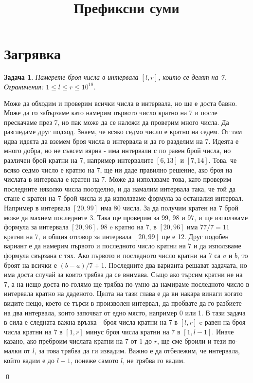 \documentclass[]{article}
\title{Префиксни суми}
\author{}
\newtheorem{problem}{Задача}
\newenvironment{solution}{\noindent{\bf Решение.}\hspace*{1em}}{\qed\par}
\begin{document}
\maketitle

\section{Загрявка}
\begin{problem}
Намерете броя числа в интервала $[l, r]$, които се делят на 7.\newline
Ограничения: $1\leq l\leq r\leq 10^{18}$.
\end{problem}
\begin{solution}
Може да обходим и проверим всички числа в интервала, но ще е доста бавно. Може да го забързаме като намерим първото число кратно на 7 и после прескачаме през 7, но пак може да се наложи да проверим много числа.\newline
Да разгледаме друг подход. Знаем, че всяко седмо число е кратно на седем. От там идва идеята да вземем броя числа в интервала и да го разделим на 7. Идеята е много добра, но не съвсем вярна - има интервали с по равен брой числа, но различен брой кратни на 7, например интервалите $[6,13]$ и $[7,14]$. Това, че всяко седмо число е кратно на 7, ще ни даде правилно решение, ако броя на числата в интервала е кратен на 7.
Може да използваме това, като проверим последните няколко числа поотделно, и да намалим интервала така, че той да стане с кратен на 7 брой числа и да използваме формула за останалия интервал. Например в интервала $[20,99]$ има 80 числа. За да получим кратен на 7 брой може да махнем последните 3. Така ще проверим за 99, 98 и 97, и ще използваме формула за интервала $[20,96]$. 98 e кратно на 7, в $[20,96]$ има $77/7=11$ кратни на 7, и общия отговор за интервала $[20,99]$ ще е 12.\newline
Друг подобен вариант е да намерим първото и последното число кратни на 7 и да използваме формула свързана с тях. Ако първото и последното число кратни на 7 са $a$ и $b$, то броят на всички е $(b-a)/7+1$.\newline
Последните два варианта решават задачата, но има доста случай за които трябва да се внимава. Също ако търсим кратни не на 7, а на нещо доста по-голямо ще трябва по-умно да намираме последното число в интервала кратно на даденото.\newline
Целта на тази глава е да ви накара винаги когато видите нещо, което се търси в произволен интервал, да пробвате да го разбиете на два интервала, които започват от едно място, например 0 или 1. В тази задача в сила е следната важна връзка - броя числа кратни на 7 в $[l,r]$ e равен на броя числа кратни на 7 в $[1,r]$ минус броя числа кратни на 7 в $[1,l-1]$. Иначе казано, ако преброим числата кратни на 7 от 1 до $r$, ще сме броили и тези по-малки от $l$, за това трябва да ги извадим. Важно е да отбележим, че интервала, който вадим е до $l-1$, понеже самото $l$, не трябва го вадим.\newline

\end{solution}
\end{document}
